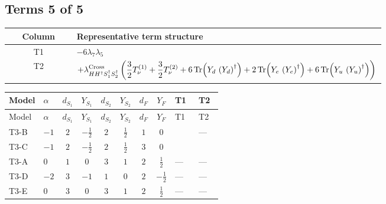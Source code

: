 \documentclass[8pt]{article}
\begin{document}
\begin{landscape}
\subsection*{Terms 5 of 5}
\begin{center}
\begin{tabular}{@{}c >{\raggedright\arraybackslash}p{0.82\linewidth}@{}}
\toprule
Column & Representative term structure \\
\midrule
T1 & \(\displaystyle -6 {\lambda_7} {\lambda_5}\) \\
\midrule
T2 & \(\displaystyle +{\lambda_{H H^\dagger S_1^\dagger S_2^\dagger}^{\rm Cross}} \left(\frac{3}{2} T_{\nu}^{(1)}+\frac{3}{2} T_{\nu}^{(2)}+6 \operatorname{Tr}\!\left({Y_d}\,\left({Y_d}\right)^{\dagger}\right)+2 \operatorname{Tr}\!\left({Y_e}\,\left({Y_e}\right)^{\dagger}\right)+6 \operatorname{Tr}\!\left({Y_u}\,\left({Y_u}\right)^{\dagger}\right)\right)\) \\
\midrule
\bottomrule
\end{tabular}
\end{center}
\smallskip
\tiny
\begin{longtable}{@{}llcccccc >{\raggedright\arraybackslash}p{0.21\linewidth} >{\raggedright\arraybackslash}p{0.21\linewidth}@{}}
\toprule
Model & $\alpha$ & $d_{S_1}$ & $Y_{S_1}$ & $d_{S_2}$ & $Y_{S_2}$ & $d_F$ & $Y_F$ & T1 & T2 \\
\midrule
\endfirsthead
\toprule
Model & $\alpha$ & $d_{S_1}$ & $Y_{S_1}$ & $d_{S_2}$ & $Y_{S_2}$ & $d_F$ & $Y_F$ & T1 & T2 \\
\midrule
\endhead
T3-B & $-1$ & $2$ & $-\frac{1}{2}$ & $2$ & $\frac{1}{2}$ & $1$ & $0$ & \scriptsize\adjustbox{max width=\linewidth}{$\begin{gathered} -6 {\lambda_7} {\lambda_5}\end{gathered}$} & --- \\
\midrule
T3-C & $-1$ & $2$ & $-\frac{1}{2}$ & $2$ & $\frac{1}{2}$ & $3$ & $0$ & \scriptsize\adjustbox{max width=\linewidth}{$\begin{gathered} -6 {\lambda_7} {\lambda_5}\end{gathered}$} & \scriptsize\adjustbox{max width=\linewidth}{$\begin{gathered} +{\lambda_{H H^\dagger S_1^\dagger S_2^\dagger}^{\rm Cross}} \left(\frac{3}{2} T_{\nu}^{(1)}+\frac{3}{2} T_{\nu}^{(2)}+6 \operatorname{Tr}\!\left({Y_d}\,\left({Y_d}\right)^{\dagger}\right)+2 \operatorname{Tr}\!\left({Y_e}\,\left({Y_e}\right)^{\dagger}\right)+6 \operatorname{Tr}\!\left({Y_u}\,\left({Y_u}\right)^{\dagger}\right)\right)\end{gathered}$} \\
\midrule
T3-A & $0$ & $1$ & $0$ & $3$ & $1$ & $2$ & $\frac{1}{2}$ & --- & --- \\
\midrule
T3-D & $-2$ & $3$ & $-1$ & $1$ & $0$ & $2$ & $-\frac{1}{2}$ & --- & --- \\
\midrule
T3-E & $0$ & $3$ & $0$ & $3$ & $1$ & $2$ & $\frac{1}{2}$ & --- & --- \\
\midrule
\bottomrule
\end{longtable}
\clearpage

\end{landscape}
\end{document}

